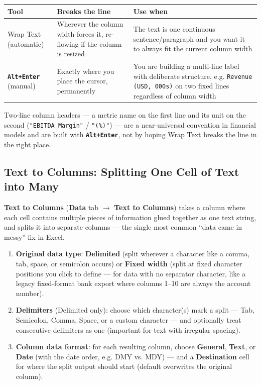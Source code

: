 \documentclass[11pt,a4paper]{article}
\newcommand{\key}[1]{\texttt{\colorbox{black!8}{\textbf{#1}}}}
\begin{document}
\begin{center}
\begin{tabular}{@{}L{3.6cm}L{4.0cm}L{4.4cm}@{}}
\toprule
\textbf{Tool} & \textbf{Breaks the line} & \textbf{Use when} \\
\midrule
Wrap Text (automatic) & Wherever the column width forces it, re-flowing if the column is resized & The text is one continuous sentence/paragraph and you want it to always fit the current column width \\
\key{Alt+Enter} (manual) & Exactly where you place the cursor, permanently & You are building a multi-line label with deliberate structure, e.g. \texttt{Revenue}\allowbreak\texttt{ (USD, 000s)} on two fixed lines regardless of column width \\
\bottomrule
\end{tabular}
\end{center}

\begin{financeapp}
Two-line column headers --- a metric name on the first line and its unit on the second (\texttt{"EBITDA Margin"} / \texttt{"(\%)"}) --- are a near-universal convention in financial models and are built with \key{Alt+Enter}, not by hoping Wrap Text breaks the line in the right place.
\end{financeapp}

\subsection{Text to Columns: Splitting One Cell of Text into Many}
\label{sec:texttocolumns}

\textbf{Text to Columns} (\textbf{Data} tab $\rightarrow$ \textbf{Text to Columns}) takes a column where each cell contains multiple pieces of information glued together as one text string, and splits it into separate columns --- the single most common ``data came in messy'' fix in Excel.

\begin{formulasyntax}
\begin{enumerate}
  \item \textbf{Original data type}: \textbf{Delimited} (split wherever a character like a comma, tab, space, or semicolon occurs) or \textbf{Fixed width} (split at fixed character positions you click to define --- for data with no separator character, like a legacy fixed-format bank export where columns 1--10 are always the account number).
  \item \textbf{Delimiters} (Delimited only): choose which character(s) mark a split --- Tab, Semicolon, Comma, Space, or a custom character --- and optionally treat consecutive delimiters as one (important for text with irregular spacing).
  \item \textbf{Column data format}: for each resulting column, choose \textbf{General}, \textbf{Text}, or \textbf{Date} (with the date order, e.g. DMY vs. MDY) --- and a \textbf{Destination} cell for where the split output should start (default overwrites the original column).
\end{enumerate}
\end{formulasyntax}
\end{document}
